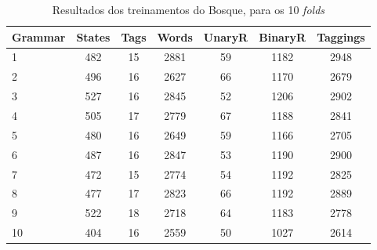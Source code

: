 \begin{table}[h!]
    \centering
    \begin{tabular}{|l|c|c|c|c|c|c|}
    \hline
        Grammar & States & Tags & Words & UnaryR & BinaryR & Taggings\\
        \hline
        1 & 482 & 15 & 2881 & 59 & 1182 & 2948\\
        2 & 496 & 16 & 2627 & 66 & 1170 & 2679\\
        3 & 527 & 16 & 2845 & 52 & 1206 & 2902\\
        4 & 505 & 17 & 2779 & 67 & 1188 & 2841\\
        5 & 480 & 16 & 2649 & 59 & 1166 & 2705\\
        6 & 487 & 16 & 2847 & 53 & 1190 & 2900\\
        7 & 472 & 15 & 2774 & 54 & 1192 & 2825\\
        8 & 477 & 17 & 2823 & 66 & 1192 & 2889\\
        9 & 522 & 18 & 2718 & 64 & 1183 & 2778\\
        10 & 404 & 16 & 2559 & 50 & 1027 & 2614\\
        \hline
    \end{tabular}
    \caption[Resultados do treinamento do Bosque]{Resultados dos treinamentos do Bosque, para os 10 \textit{folds}}
    \label{tab:resultados_treino_bosque}
\end{table}